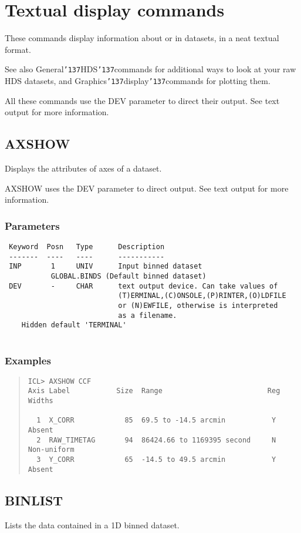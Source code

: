 \documentclass{book}
\renewcommand{\_}{{\tt\char'137}}     %
\begin{document}
\chapter{Textual display commands}
These commands display information about or in datasets, in a
neat textual format.
 
See also General\_HDS\_commands for additional ways to look at your
raw HDS datasets, and Graphics\_display\_commands for plotting them.
 
All these commands use the DEV parameter to direct their output.
See text output for more information.
 
\section{AXSHOW}
Displays the attributes of axes of a dataset.
 
AXSHOW uses the DEV parameter to direct output. See text output
for more information.
 
\subsection{Parameters}
\begin{verbatim}
 Keyword  Posn   Type      Description
 -------  ----   ----      -----------
 INP       1     UNIV      Input binned dataset
           GLOBAL.BINDS (Default binned dataset)
 DEV       -     CHAR      text output device. Can take values of
                           (T)ERMINAL,(C)ONSOLE,(P)RINTER,(O)LDFILE
                           or (N)EWFILE, otherwise is interpreted
                           as a filename.
    Hidden default 'TERMINAL'
 
\end{verbatim}\subsection{Examples}
\begin{quote}\begin{verbatim}
ICL> AXSHOW CCF
Axis Label           Size  Range                         Reg Widths
 
  1  X_CORR            85  69.5 to -14.5 arcmin           Y  Absent
  2  RAW_TIMETAG       94  86424.66 to 1169395 second     N  Non-uniform
  3  Y_CORR            65  -14.5 to 49.5 arcmin           Y  Absent
\end{verbatim}\end{quote}
\section{BINLIST}
Lists the data contained in a 1D binned dataset.
 
\end{document}
